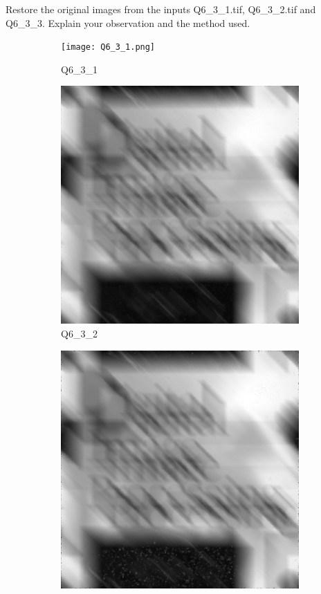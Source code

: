 \documentclass[
	12pt, %
]{style/fphw}
\begin{document}
\begin{problem}
	Restore the original images from the inputs Q6\_3\_1.tif, Q6\_3\_2.tif and Q6\_3\_3. Explain your observation and the method used.

	\begin{figure}[H]
		\centering
		\begin{subfigure}[b]{.3\textwidth}
			\centering
			\texttt{[image: Q6\_3\_1.png]}
			\caption{Q6\_3\_1}
			\label{Q6_3_1}
		\end{subfigure}
		\hfill
		\begin{subfigure}[b]{.3\textwidth}
			\centering
			\includegraphics[width=0.9\linewidth]{Q6_3_2.png}
			\caption{Q6\_3\_2}
			\label{Q6_3_2}
		\end{subfigure}
		\hfill
		\begin{subfigure}[b]{.3\textwidth}
			\centering
			\includegraphics[width=0.9\linewidth]{Q6_3_3.png}

\end{subfigure}
\end{figure}
\end{problem}
\end{document}
